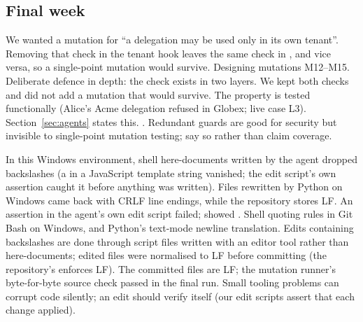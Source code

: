 \subsection{Final week}

{We wanted a mutation for ``a delegation may be used only in its own tenant''. Removing that check in the tenant hook leaves the same check in , and vice versa, so a single-point mutation would survive.}
{Designing mutations M12--M15.}
{Deliberate defence in depth: the check exists in two layers.}
{We kept both checks and did not add a mutation that would survive. The property is tested functionally (Alice's Acme delegation refused in Globex; live case L3). Section~\ref{sec:agents} states this.}
{.}
{Redundant guards are good for security but invisible to single-point mutation testing; say so rather than claim coverage.}

{In this Windows environment, shell here-documents written by the agent dropped backslashes (a  in a JavaScript template string vanished; the edit script's own assertion caught it before anything was written). Files rewritten by Python on Windows came back with CRLF line endings, while the repository stores LF.}
{An assertion in the agent's own edit script failed;  showed .}
{Shell quoting rules in Git Bash on Windows, and Python's text-mode newline translation.}
{Edits containing backslashes are done through script files written with an editor tool rather than here-documents; edited files were normalised to LF before committing (the repository's  enforces LF).}
{The committed files are LF; the mutation runner's byte-for-byte source check passed in the final run.}
{Small tooling problems can corrupt code silently; an edit should verify itself (our edit scripts assert that each change applied).}

